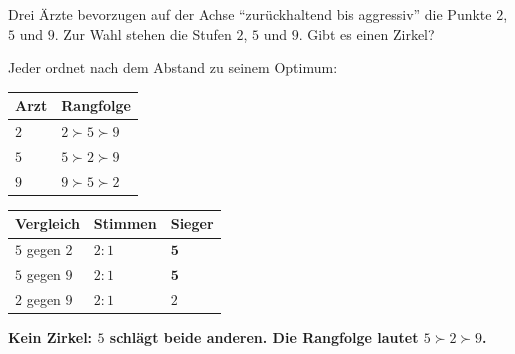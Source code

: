 \begin{aufgabe}
Drei Ärzte bevorzugen auf der Achse \enquote{zurückhaltend bis aggressiv} die Punkte $2$, $5$ und $9$. Zur Wahl stehen die Stufen $2$, $5$ und $9$. Gibt es einen Zirkel?

\loesung
{}
Jeder ordnet nach dem Abstand zu seinem Optimum:
\begin{center}
{\small
\renewcommand{\arraystretch}{1.48}
\begin{tabular}{@{}P{1.8cm}P{4.2cm}@{}}
\toprule
\textbf{Arzt} & \textbf{Rangfolge}\\
\midrule
$2$ & $2 \succ 5 \succ 9$\\
$5$ & $5 \succ 2 \succ 9$\\
$9$ & $9 \succ 5 \succ 2$\\
\bottomrule
\end{tabular}}
\end{center}

\begin{center}
{\small
\renewcommand{\arraystretch}{1.48}
\begin{tabular}{@{}P{2.2cm}P{2.4cm}P{2.2cm}@{}}
\toprule
\textbf{Vergleich} & \textbf{Stimmen} & \textbf{Sieger}\\
\midrule
$5$ gegen $2$ & $2 : 1$ & $\mathbf{5}$\\
$5$ gegen $9$ & $2 : 1$ & $\mathbf{5}$\\
$2$ gegen $9$ & $2 : 1$ & $2$\\
\bottomrule
\end{tabular}}
\end{center}

\begin{center}
\begin{minipage}{0.9\textwidth}
\textbf{Kein Zirkel: $5$ schlägt beide anderen. Die Rangfolge lautet $5 \succ 2 \succ 9$.}
\end{minipage}
\end{center}

\begin{center}
\begin{minipage}{0.88\textwidth}
\end{minipage}
\end{center}


\end{aufgabe}
